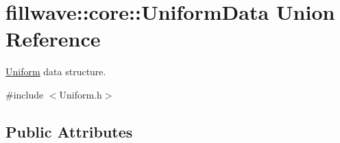 \hypertarget{unionfillwave_1_1core_1_1UniformData}{}\section{fillwave\+:\+:core\+:\+:Uniform\+Data Union Reference}
\label{unionfillwave_1_1core_1_1UniformData}


\hyperlink{classfillwave_1_1core_1_1Uniform}{Uniform} data structure.  




{\ttfamily \#include $<$Uniform.\+h$>$}

\subsection*{Public Attributes}
